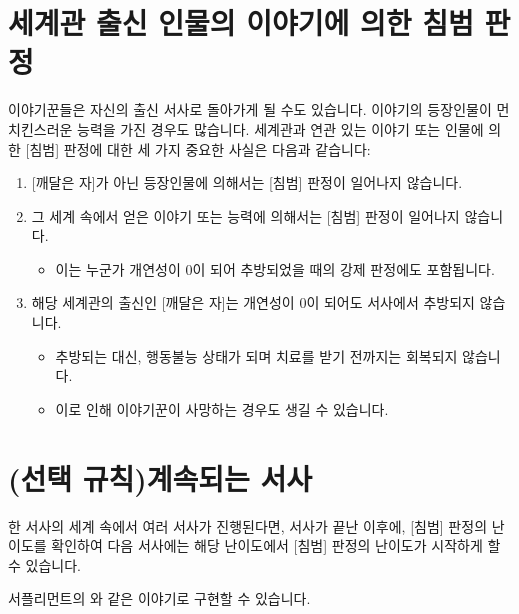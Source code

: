 \documentclass{report}
\begin{document}
	\section*{세계관 출신 인물의 이야기에 의한 침범 판정}
	이야기꾼들은 자신의 출신 서사로 돌아가게 될 수도 있습니다. 이야기의 등장인물이 먼치킨스러운 능력을 가진 경우도 많습니다. 세계관과 연관 있는 이야기 또는 인물에 의한 [침범] 판정에 대한 세 가지 중요한 사실은 다음과 같습니다:
	\begin{enumerate}
		\item {}[깨달은 자]가 아닌 등장인물에 의해서는 [침범] 판정이 일어나지 않습니다.
		\item 그 세계 속에서 얻은 이야기 또는 능력에 의해서는 [침범] 판정이 일어나지 않습니다.
		\begin{itemize}
			\item 이는 누군가 개연성이 0이 되어 추방되었을 때의 강제 판정에도 포함됩니다.
		\end{itemize}
		\item 해당 세계관의 출신인 [깨달은 자]는 개연성이 0이 되어도 서사에서 추방되지 않습니다.
		\begin{itemize}
			\item 추방되는 대신, 행동불능 상태가 되며 치료를 받기 전까지는 회복되지 않습니다.
			\item 이로 인해 이야기꾼이 사망하는 경우도 생길 수 있습니다.
		\end{itemize}
	\end{enumerate}
	
	\ifprintout\else
	\section*{\hypertarget{the-story-continues}{(선택 규칙)계속되는 서사}}
	한 서사의 세계 속에서 여러 서사가 진행된다면, 서사가 끝난 이후에, [침범] 판정의 난이도를 확인하여 다음 서사에는 해당 난이도에서 [침범] 판정의 난이도가 시작하게 할 수 있습니다.
	
	서플리먼트의 와 같은 이야기로 구현할 수 있습니다.
	\fi
\end{document}
